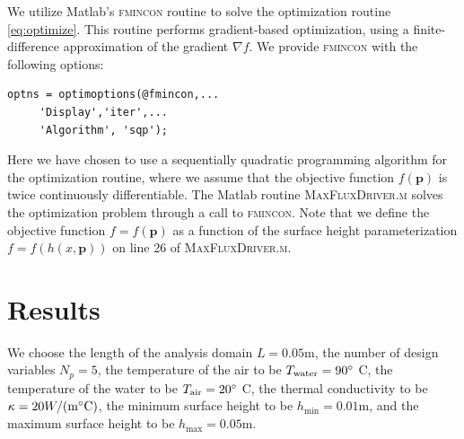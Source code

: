 \documentclass[11pt]{article}
\begin{document}
We utilize Matlab's \textsc{fmincon} routine to solve the
optimization routine \eqref{eq:optimize}. This routine performs
gradient-based optimization, using a finite-difference approximation
of the gradient $\nabla f$. We provide \textsc{fmincon} with the
following options:
\begin{verbatim}
optns = optimoptions(@fmincon,...
     'Display','iter',...
     'Algorithm', 'sqp');
\end{verbatim}
Here we have chosen to use a sequentially quadratic programming
algorithm for the optimization routine, where we assume that the
objective function $f(\boldsymbol{p})$ is twice continuously
differentiable. The Matlab routine \textsc{MaxFluxDriver.m} solves
the optimization problem through a call to \textsc{fmincon}. Note
that we define the objective function $f = f(\boldsymbol{p})$ as
a function of the surface height parameterization
$f = f(h(x, \boldsymbol{p}))$ on line 26 of
\textsc{MaxFluxDriver.m}.

\section{Results}

We choose the length of the analysis domain $L=0.05$m, the
number of design variables $N_p = 5$, the temperature of the
air to be $T_\text{water} = 90 \degree$ C, the temperature of the
water to be $T_\text{air} = 20 \degree$ C, the thermal
conductivity to be $\kappa = 20 W / (\text{m} \degree \text{C})$,
the minimum surface height to be $h_{\text{min}} = 0.01$m, and
the maximum surface height to be $h_{\text{max}} = 0.05$m.
\end{document}
